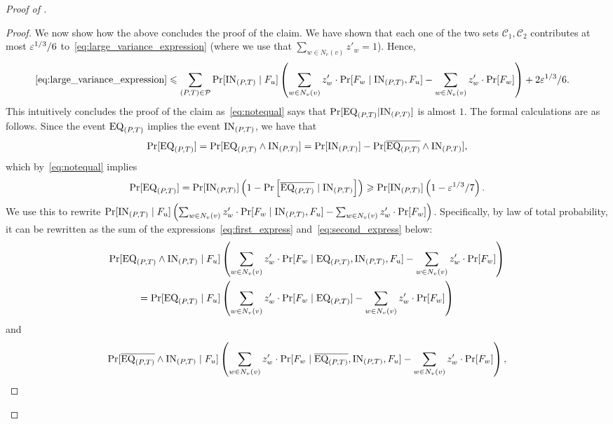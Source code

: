 \begin{proof}[Proof of ]
\begin{proof}
		We now show how  the above concludes the proof of the claim.  We have shown that each one of the two sets $\mathcal{C}_1, \mathcal{C}_2$  contributes at most $\varepsilon^{1/3}/6$ to~\eqref{eq:large_variance_expression} (where we use that  $\sum_{w\in N_v(v)} z'_w = 1$). Hence,
		\begin{align*}
		\eqref{eq:large_variance_expression} &\leqslant 
		\sum_{(P,T)\in \mathcal{P}}\Pr[\mathrm{IN}_{(P,T)} \mid F_u] \left(\sum_{w\in N_v(v)} z'_w \cdot \Pr[F_w \mid \mathrm{IN}_{(P,T)}, F_u] - \sum_{w\in N_v(v)} z'_w \cdot \Pr[F_w] \right) + 2\varepsilon^{1/3}/6.
		\end{align*}
		This intuitively concludes the proof of the claim as~\eqref{eq:notequal} says that $\Pr[\mathrm{EQ}_{(P,T)}| \mathrm{IN}_{(P,T)}]$ is almost $1$. The formal calculations are as follows.
		Since the event $\mathrm{EQ}_{(P,T)}$ implies the event $\mathrm{IN}_{(P,T)}$, we have that
		\begin{align*}
		\Pr[\mathrm{EQ}_{(P,T)}] = \Pr[\mathrm{EQ}_{(P,T)} \wedge \mathrm{IN}_{(P,T)}]  = \Pr[\mathrm{IN}_{(P,T)} ] - \Pr[\overline{\mathrm{EQ}_{(P,T)}} \wedge \mathrm{IN}_{(P,T)}], 
		\end{align*}
		which by~\eqref{eq:notequal} implies
		\begin{align}
		\Pr[\mathrm{EQ}_{(P,T)} ] = \Pr[\mathrm{IN}_{(P,T)} ]\left( 1- \Pr\left[\overline{\mathrm{EQ}_{(P,T)}}\mid \mathrm{IN}_{(P,T)} \right]\right) \geqslant \Pr[\mathrm{IN}_{(P,T)} ] \left(1- \varepsilon^{1/3}/7   \right).\label{eq:EQ-in-terms-of-IN}
		\end{align}
		We use this to rewrite $\Pr[\mathrm{IN}_{(P,T)} \mid F_u] \left(\sum_{w\in N_v(v)} z'_w \cdot \Pr[F_w \mid \mathrm{IN}_{(P,T)}, F_u] - \sum_{w\in N_v(v)} z'_w \cdot \Pr[F_w] \right)$. Specifically, by law of total probability, it can be rewritten as the sum of the expressions~\eqref{eq:first_express} and~\eqref{eq:second_express} below:
		\begin{align}
		 \Pr[\mathrm{EQ}_{(P,T)} \wedge \mathrm{IN}_{(P,T)} \mid F_u] & \left(\sum_{w\in N_v(v)} z'_w \cdot \Pr[F_w \mid \mathrm{EQ}_{(P,T)}, \mathrm{IN}_{(P,T)}, F_u] - \sum_{w\in N_v(v)} z'_w \cdot \Pr[F_w] \right) \nonumber\\
		 = \Pr[\mathrm{EQ}_{(P,T)}  \mid F_u] & \left(\sum_{w\in N_v(v)} z'_w \cdot \Pr[F_w \mid \mathrm{EQ}_{(P,T)}] - \sum_{w\in N_v(v)} z'_w \cdot \Pr[F_w] \right) 		\label{eq:first_express}
		\end{align}
		and
		\begin{align}\label{eq:second_express}
		\Pr[\overline{\EventEQ{(P,T)}} \wedge \EventIN{(P,T)} \mid F_u] \left(\sum_{w\in N_v(v)} z'_w \cdot \Pr[F_w \mid \overline{\EventEQ{(P,T)}}, \EventIN{(P,T)}, F_u] - \sum_{w\in N_v(v)} z'_w \cdot \Pr[F_w] \right), 

\end{align}
\end{proof}
\end{proof}
